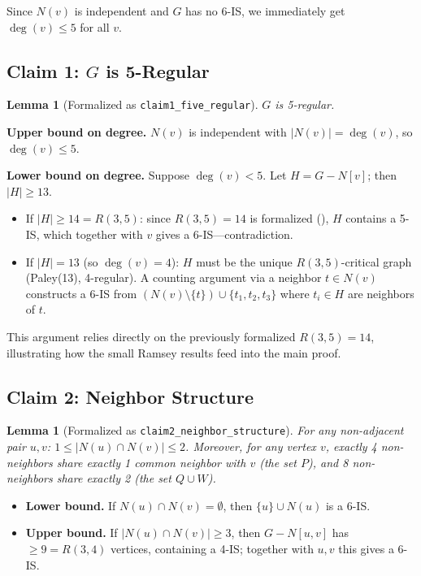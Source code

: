 \documentclass[11pt]{article}
\newtheorem{lemma}[theorem]{Lemma}
\newcommand{\lean}[1]{\texttt{#1}}
\newcommand{\RR}[2]{R(#1,#2)}
\begin{document}
\noindent
Since $N(v)$ is independent and $G$ has no 6-IS, we immediately get
$\deg(v) \leq 5$ for all $v$.

\subsection{Claim 1: \texorpdfstring{$G$ is 5-Regular}{G is 5-Regular}}

\begin{lemma}[Formalized as \lean{claim1\_five\_regular}]
$G$ is 5-regular.
\end{lemma}

\textbf{Upper bound on degree.}
$N(v)$ is independent with $|N(v)| = \deg(v)$, so $\deg(v) \leq 5$.

\textbf{Lower bound on degree.}
Suppose $\deg(v) < 5$.
Let $H = G - N[v]$; then $|H| \geq 13$.
\begin{itemize}
  \item If $|H| \geq 14 = \RR{3}{5}$: since $\RR{3}{5} = 14$ is formalized
    (), $H$ contains a 5-IS, which together with $v$ gives
    a 6-IS---contradiction.
  \item If $|H| = 13$ (so $\deg(v) = 4$): $H$ must be the unique
    $\RR{3}{5}$-critical graph (Paley(13), 4-regular).
    A counting argument via a neighbor $t \in N(v)$ constructs a 6-IS
    from $(N(v) \setminus \{t\}) \cup \{t_1, t_2, t_3\}$ where $t_i \in H$
    are neighbors of $t$.
\end{itemize}

\noindent
This argument relies directly on the previously formalized $\RR{3}{5} = 14$,
illustrating how the small Ramsey results feed into the main proof.

\subsection{Claim 2: Neighbor Structure}

\begin{lemma}[Formalized as \lean{claim2\_neighbor\_structure}]
For any non-adjacent pair $u, v$: $1 \leq |N(u) \cap N(v)| \leq 2$.
Moreover, for any vertex $v$, exactly 4 non-neighbors share exactly 1 common
neighbor with $v$ (the set $P$), and 8 non-neighbors share exactly 2 (the
set $Q \cup W$).
\end{lemma}

\begin{itemize}
\item \textbf{Lower bound.} If $N(u) \cap N(v) = \emptyset$, then
  $\{u\} \cup N(u)$ is a 6-IS.
\item \textbf{Upper bound.} If $|N(u) \cap N(v)| \geq 3$, then
  $G - N[u,v]$ has $\geq 9 = \RR{3}{4}$ vertices, containing a 4-IS;
  together with $u,v$ this gives a 6-IS.
\end{itemize}
\end{document}

